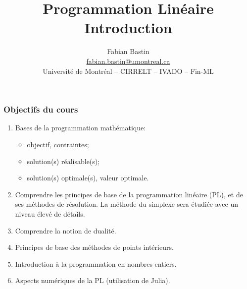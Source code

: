 \documentclass[usepdftitle=false]{beamer}
\title[Programmation Linéaire]{Programmation Linéaire\\Introduction}
\author[Fabian Bastin]{Fabian Bastin \\ \url{fabian.bastin@umontreal.ca} \\ Université de Montréal -- CIRRELT -- IVADO -- Fin-ML}
\date{}
\begin{document}
\frame{\titlepage}

\begin{frame}
\frametitle{Objectifs du cours}

\begin{enumerate}
\item
Bases de la programmation mathématique:
\begin{itemize}
\item
objectif, contraintes;
\item
solution(s) réalisable(s);
\item
solution(s) optimale(s), valeur optimale.
\end{itemize}
\item
Comprendre les principes de base de la programmation linéaire (PL), et de ses méthodes de résolution. La méthode du simplexe sera étudiée avec un niveau élevé de détails.
\item
Comprendre la notion de dualité.
\item
Principes de base des méthodes de points intérieurs.
\item
Introduction à la programmation en nombres entiers.
\item
Aspects numériques de la PL (utilisation de Julia).
\end{enumerate}

\end{frame}
\end{document}
